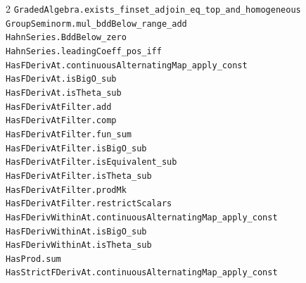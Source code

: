 \documentclass[10pt,a4paper]{article}
\begin{document}
\begin{multicols}{2}
\texttt{GradedAlgebra.\allowbreak{}exists\_finset\_adjoin\_eq\_top\_and\_homogeneous} \\
\texttt{GroupSeminorm.\allowbreak{}mul\_bddBelow\_range\_add} \\
\texttt{HahnSeries.\allowbreak{}BddBelow\_zero} \\
\texttt{HahnSeries.\allowbreak{}leadingCoeff\_pos\_iff} \\
\texttt{HasFDerivAt.\allowbreak{}continuousAlternatingMap\_apply\_const} \\
\texttt{HasFDerivAt.\allowbreak{}isBigO\_sub} \\
\texttt{HasFDerivAt.\allowbreak{}isTheta\_sub} \\
\texttt{HasFDerivAtFilter.\allowbreak{}add} \\
\texttt{HasFDerivAtFilter.\allowbreak{}comp} \\
\texttt{HasFDerivAtFilter.\allowbreak{}fun\_sum} \\
\texttt{HasFDerivAtFilter.\allowbreak{}isBigO\_sub} \\
\texttt{HasFDerivAtFilter.\allowbreak{}isEquivalent\_sub} \\
\texttt{HasFDerivAtFilter.\allowbreak{}isTheta\_sub} \\
\texttt{HasFDerivAtFilter.\allowbreak{}prodMk} \\
\texttt{HasFDerivAtFilter.\allowbreak{}restrictScalars} \\
\texttt{HasFDerivWithinAt.\allowbreak{}continuousAlternatingMap\_apply\_const} \\
\texttt{HasFDerivWithinAt.\allowbreak{}isBigO\_sub} \\
\texttt{HasFDerivWithinAt.\allowbreak{}isTheta\_sub} \\
\texttt{HasProd.\allowbreak{}sum} \\
\texttt{HasStrictFDerivAt.\allowbreak{}continuousAlternatingMap\_apply\_const} \\

\end{multicols}
\end{document}
